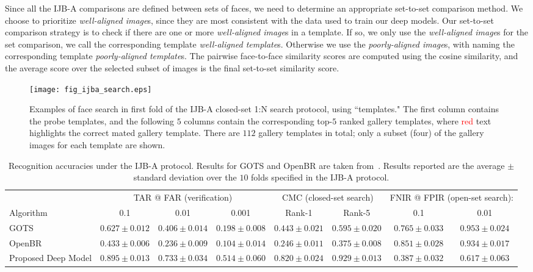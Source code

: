 \documentclass[10pt,journal,compsoc]{IEEEtran}
\begin{document}
Since all the IJB-A comparisons are defined between sets of faces, we need to determine an appropriate set-to-set comparison method. We choose to prioritize \emph{well-aligned image}s, since they are most consistent with the data used to train our deep models. Our set-to-set comparison strategy is to check if there are one or more \emph{well-aligned image}s in a template. If so, we only use the \emph{well-aligned image}s for the set comparison, we call the corresponding template \emph{well-aligned template}s. Otherwise we use the \emph{poorly-aligned image}s, with naming the corresponding template \emph{poorly-aligned template}s. The pairwise face-to-face similarity scores are computed using the cosine similarity, and the average score over the selected subset of images is the final set-to-set similarity score.

\begin{figure*}[htbp]
    \centering
    \texttt{[image: fig\_ijba\_search.eps]}
    \vspace{-0.1in}
    \caption{Examples of face search in first fold of the IJB-A closed-set 1:N search protocol, using ``templates." The first column contains the probe templates, and the following $5$ columns contain the corresponding top-$5$ ranked gallery templates, where \textcolor{red}{red} text highlights the correct mated gallery template. There are $112$ gallery templates in total; only a subset (four) of the gallery images for each template are shown.}\label{fig:ijba-search}
\end{figure*}

\begin{table*}[htbp]
    \caption{Recognition accuracies under the IJB-A protocol. Results for GOTS and OpenBR are taken from~\cite{db:janus}. Results reported are the average $\pm$ standard deviation over the $10$ folds specified in the IJB-A protocol.}
    \label{tab:ijba_perf}
    \begin{tabular}{lccccccc}
        \toprule
            & \multicolumn{3}{c}{TAR @ FAR (verification)} & \multicolumn{2}{c}{CMC (closed-set search)} & \multicolumn{2}{c}{FNIR @ FPIR (open-set search):} \\
            \cmidrule(lr){2-4} \cmidrule(lr){5-6} \cmidrule(lr){7-8}
        Algorithm    & 0.1 & 0.01 & 0.001 & Rank-1 & Rank-5 & 0.1 & 0.01 \\
        \midrule
        GOTS & $0.627 \pm 0.012$ & $ 0.406 \pm 0.014$ & $0.198 \pm 0.008$ &  $ 0.443 \pm 0.021$  & $0.595 \pm 0.020$
                & $0.765 \pm 0.033$ & $0.953 \pm 0.024$ \\
        OpenBR & $0.433 \pm 0.006$ & $0.236 \pm 0.009$ & $0.104 \pm 0.014$ & $0.246 \pm 0.011$ & $0.375 \pm 0.008$ & $0.851 \pm0.028$ & $0.934 \pm 0.017$ \\
        Proposed Deep Model & $0.895 \pm 0.013$ & $0.733 \pm 0.034$ & $0.514 \pm 0.060$ & $0.820 \pm 0.024$ & $0.929 \pm 0.013$ & $0.387 \pm0.032$ & $0.617 \pm 0.063$ \\
        \bottomrule
    \end{tabular}
\end{table*}
\end{document}
